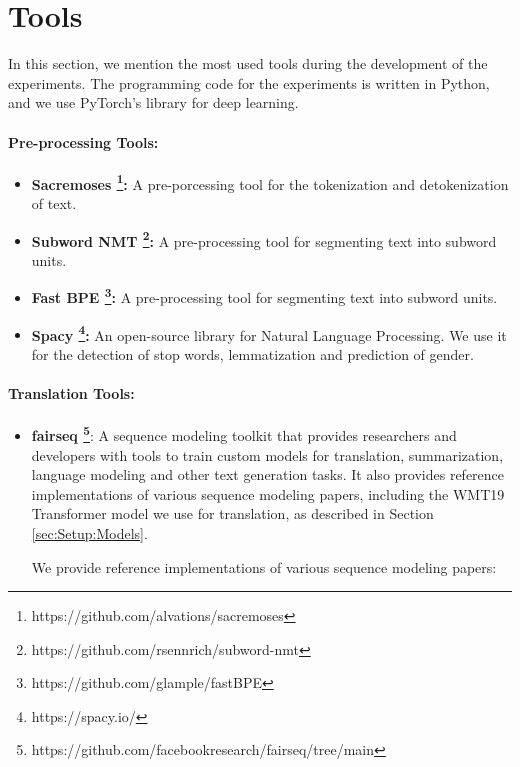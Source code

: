 \section{Tools}
\label{sec:Experiments:Tools}

In this section, we mention the most used tools during the development of the experiments. The programming code for the experiments is written in Python, and we use PyTorch's library for deep learning.

\paragraph{Pre-processing Tools:}
\begin{itemize}
    \item \textbf{Sacremoses \footnote{https://github.com/alvations/sacremoses}:} A pre-porcessing tool for the tokenization and detokenization of text.
    \item \textbf{Subword NMT \footnote{https://github.com/rsennrich/subword-nmt}:} A pre-processing tool for segmenting text into subword units. %
    \item \textbf{Fast BPE \footnote{https://github.com/glample/fastBPE}:} A pre-processing tool for segmenting text into subword units. %
    \item \textbf{Spacy \footnote{https://spacy.io/}:} An open-source library for Natural Language Processing. We use it for the detection of stop words, lemmatization and prediction of gender.
\end{itemize}

\paragraph{Translation Tools:}
\begin{itemize}
    \item \textbf{fairseq \footnote{https://github.com/facebookresearch/fairseq/tree/main}}: A sequence modeling toolkit that provides researchers and developers with tools to train custom models for translation, summarization, language modeling and other text generation tasks. It also provides reference implementations of various sequence modeling papers, including the WMT19 Transformer model \parencite{WMT19} we use for translation, as described in Section \ref{sec:Setup:Models}.

We provide reference implementations of various sequence modeling papers:
\end{itemize}

